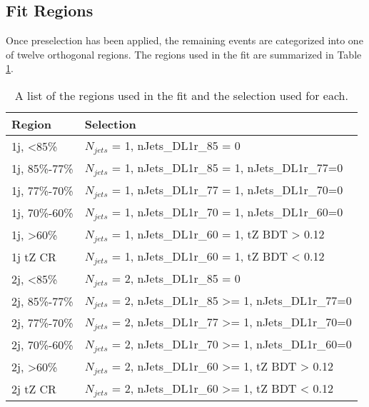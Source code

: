 \subsection{Fit Regions}
\label{subsec:regions}

Once preselection has been applied, the remaining events are categorized into one of twelve orthogonal regions. The regions used in the fit are summarized in Table \ref{tab:regions}.

\begin{table}[H] 
\centering
\caption{A list of the regions used in the fit and the selection used for each.}
\begin{tabular}{l|l}
\hline\hline
Region & Selection            \\
\hline
\hline
1j, <85\%       & $N_{jets}$ = 1, nJets\_DL1r\_85 = 0            \\
1j, 85\%-77\%   & $N_{jets}$ = 1, nJets\_DL1r\_85 = 1, nJets\_DL1r\_77=0                     \\
1j, 77\%-70\%   & $N_{jets}$ = 1, nJets\_DL1r\_77 = 1, nJets\_DL1r\_70=0                     \\
1j, 70\%-60\%   & $N_{jets}$ = 1, nJets\_DL1r\_70 = 1, nJets\_DL1r\_60=0                      \\
1j, >60\%       & $N_{jets}$ = 1, nJets\_DL1r\_60 = 1, tZ BDT > 0.12 \\
1j tZ CR        & $N_{jets}$ = 1, nJets\_DL1r\_60 = 1, tZ BDT < 0.12 \\
2j, <85\%       & $N_{jets}$ = 2, nJets\_DL1r\_85 = 0                    \\
2j, 85\%-77\%   & $N_{jets}$ = 2, nJets\_DL1r\_85 >= 1, nJets\_DL1r\_77=0                     \\
2j, 77\%-70\%   & $N_{jets}$ = 2, nJets\_DL1r\_77 >= 1, nJets\_DL1r\_70=0                     \\
2j, 70\%-60\%   & $N_{jets}$ = 2, nJets\_DL1r\_70 >= 1, nJets\_DL1r\_60=0                      \\
2j, >60\%       & $N_{jets}$ = 2, nJets\_DL1r\_60 >= 1, tZ BDT > 0.12 \\
2j tZ CR        & $N_{jets}$ = 2, nJets\_DL1r\_60 >= 1, tZ BDT < 0.12 \\
\hline\hline
\end{tabular}
\label{tab:regions}
\end{table}

